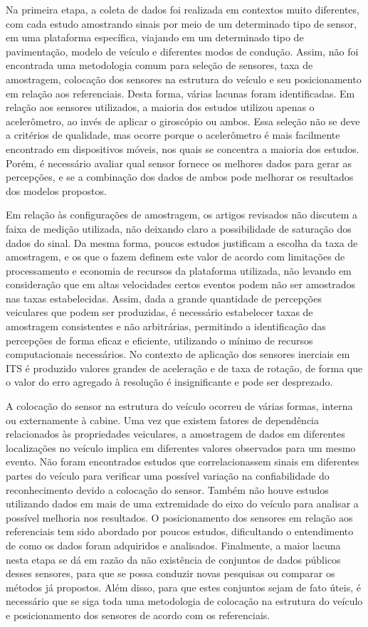 Na primeira etapa, a coleta de dados foi realizada em contextos muito diferentes, com cada estudo amostrando sinais por meio de um determinado tipo de sensor, em uma plataforma específica, viajando em um determinado tipo de pavimentação, modelo de veículo e diferentes modos de condução. Assim, não foi encontrada uma metodologia comum para seleção de sensores, taxa de amostragem, colocação dos sensores na estrutura do veículo e seu posicionamento em relação aos referenciais. Desta forma, várias lacunas foram identificadas. Em relação aos sensores utilizados, a maioria dos estudos utilizou apenas o acelerômetro, ao invés de aplicar o giroscópio ou ambos. Essa seleção não se deve a critérios de qualidade, mas ocorre porque o acelerômetro é mais facilmente encontrado em dispositivos móveis, nos quais se concentra a maioria dos estudos. Porém, é necessário avaliar qual sensor fornece os melhores dados para gerar as percepções, e se a combinação dos dados de ambos pode melhorar os resultados dos modelos propostos.

Em relação às configurações de amostragem, os artigos revisados não discutem a faixa de medição utilizada, não deixando claro a possibilidade de saturação dos dados do sinal. Da mesma forma, poucos estudos justificam a escolha da taxa de amostragem, e os que o fazem definem este valor de acordo com limitações de processamento e economia de recursos da plataforma utilizada, não levando em consideração que em altas velocidades certos eventos podem não ser amostrados nas taxas estabelecidas. Assim, dada a grande quantidade de percepções veiculares que podem ser produzidas, é necessário estabelecer taxas de amostragem consistentes e não arbitrárias, permitindo a identificação das percepções de forma eficaz e eficiente, utilizando o mínimo de recursos computacionais necessários. No contexto de aplicação dos sensores inerciais em ITS é produzido valores grandes de aceleração e de taxa de rotação, de forma que o valor do erro agregado à resolução é insignificante e pode ser desprezado.

A colocação do sensor na estrutura do veículo ocorreu de várias formas, interna ou externamente à cabine. Uma vez que existem fatores de dependência relacionados às propriedades veiculares, a amostragem de dados em diferentes localizações no veículo implica em diferentes valores observados para um mesmo evento. Não foram encontrados estudos que correlacionassem sinais em diferentes partes do veículo para verificar uma possível variação na confiabilidade do reconhecimento devido a colocação do sensor. Também não houve estudos utilizando dados em mais de uma extremidade do eixo do veículo para analisar a possível melhoria nos resultados. O posicionamento dos sensores em relação aos referenciais tem sido abordado por poucos estudos, dificultando o entendimento de como os dados foram adquiridos e analisados. Finalmente, a maior lacuna nesta etapa se dá em razão da não existência de conjuntos de dados públicos desses sensores, para que se possa conduzir novas pesquisas ou comparar os métodos já propostos. Além disso, para que estes conjuntos sejam de fato úteis, é necessário que se siga toda uma metodologia de colocação na estrutura do veículo e posicionamento dos sensores de acordo com os referenciais.

